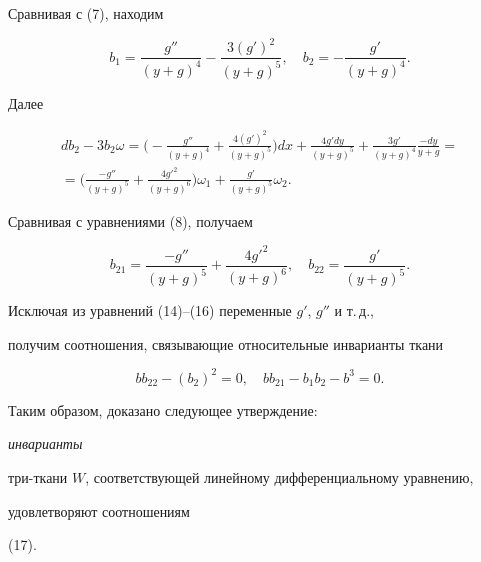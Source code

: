Сравнивая с (7), находим 


\begin{equation} 


b_1=\frac{g''}{(y+g)^4}-\frac{3(g')^2}{(y+g)^5},\quad 


b_2=-\frac{g'}{(y+g)^4}. 


\end{equation} 


Далее 


\begin{multline*}  


d b_2-3b_2\omega=\bigg(-\frac{g''}{(y+g)^4}+\frac{4(g')^2}{(y+g)^5} 


\bigg)dx +\frac{4g' dy}{(y+g)^5}+\frac{3g'}{(y+g)^4} 


\frac{-dy}{y+g}= \\


%


=\bigg(\frac{-g''}{(y+g)^5}+\frac{{4g'}^2}{(y+g)^6} \bigg)\omega_1+ 


\frac{g'}{(y+g)^5}\omega_2. 


\end{multline*}  


 


Сравнивая с уравнениями (8), получаем 


\begin{equation} 


b_{21}=\frac{-g''}{(y+g)^5}+\frac{{4g'}^2}{(y+g)^6},\quad 


b_{22}=\frac{g'}{(y+g)^5}. 


\end{equation}  


Исключая из уравнений (14)--(16) переменные $g'$, $g''$ и т.\,д., 


получим соотношения, связывающие относительные инварианты ткани 


\begin{equation} 


b b_{22}-(b_2)^2=0,\quad 


b b_{21}-b_1b_2-b^3=0. 


\end{equation} 


 


Таким образом, доказано следующее утверждение: {\it инварианты 


три-ткани $W$, соответствующей линейному дифференциальному уравнению, 


удовлетворяют соотношениям} (17). 


